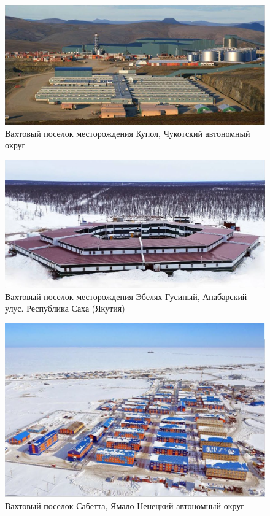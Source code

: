\begin{figure}
    \centering
    \includegraphics[width=\textwidth]{assets/figures/st1ch03_ruexp_008.png}
    \caption{Вахтовый поселок месторождения Купол, Чукотский автономный округ}
    \label{fig:st1ch03_ruexp_008}
  \end{figure}


\begin{figure}
    \centering
    \includegraphics[width=\textwidth]{assets/figures/st1ch03_ruexp_009.png}
    \caption{Вахтовый поселок месторождения Эбелях-Гусиный, Анабарский улус. Республика Саха (Якутия)}
    \label{fig:st1ch03_ruexp_009}
  \end{figure}


\begin{figure}
    \centering
    \includegraphics[width=\textwidth]{assets/figures/st1ch03_ruexp_010.png}
    \caption{Вахтовый поселок Сабетта, Ямало-Ненецкий автономный округ}
    \label{fig:st1ch03_ruexp_010}
  \end{figure}

